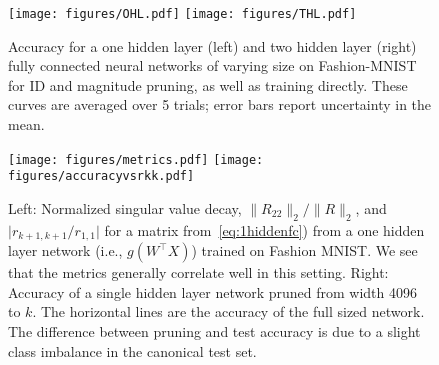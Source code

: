 \begin{figure}
\centering
  \centering
  \texttt{[image: figures/OHL.pdf]}
  \hspace{2mm}
  \texttt{[image: figures/THL.pdf]}
  
    \caption{Accuracy for a one hidden layer (left) and two hidden layer (right) fully connected neural networks of varying size on Fashion-MNIST for ID and magnitude pruning, as well as training directly.
    These curves are averaged over 5 trials; error bars report uncertainty in the mean. 
    }
\label{fig:fmnist}
\end{figure}

\begin{figure}[ht]
\centering
  \texttt{[image: figures/metrics.pdf]}
  \texttt{[image: figures/accuracyvsrkk.pdf]}

    \caption{Left: Normalized singular value decay, $\|R_{22}\|_2/\|R\|_2$, and $\lvert r_{k+1,k+1}/r_{1,1}\rvert$ for a matrix from~\eqref{eq:1hiddenfc}) from a one hidden layer network (i.e., $g(W^\top X)$) trained on Fashion MNIST. We see that the metrics generally correlate well in this setting. Right: Accuracy of a single hidden layer network pruned from width 4096 to $k.$  The horizontal lines are the accuracy of the full sized network. The difference  between pruning and test accuracy is due to a slight class imbalance in the canonical test set.}%
\label{fig:chosingk}
\end{figure}


